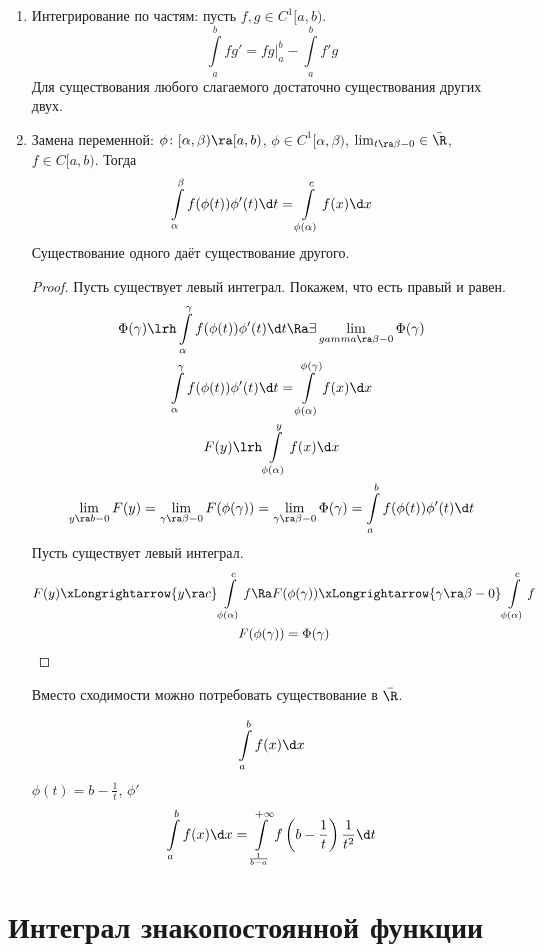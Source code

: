 \begin{enumerate}
\item
	Интегрирование по частям: пусть $f, g \in C^1[a,b)$.
	\[ \int\limits_a^b fg' = fg \biggr|_a^b - \int\limits_a^b f'g \]
	Для существования любого слагаемого достаточно существования других двух.

\item
	Замена переменной: $\phi\colon [\alpha, \beta) \ra [a, b)$, $\phi \in C^1[\alpha, \beta)$, $\lim_{t\ra\beta-0} \in \bar \R$,
	$f \in C[a, b)$.
	Тогда
	\[ \int\limits_\alpha^\beta f(\phi(t)) \phi'(t) \d t = \int\limits_{\phi(\alpha)}^c f(x) \d x \]
	Существование одного даёт существование другого.
	\begin{proof}
		Пусть существует левый интеграл.
		Покажем, что есть правый и равен.
		\begin{gather*}
			\Phi(\gamma) \lrh \int\limits_\alpha^\gamma f(\phi(t)) \phi'(t) \d t \Ra \exists \lim_{gamma\ra\beta-0} \Phi(\gamma) \\
			\int\limits_\alpha^\gamma f(\phi(t)) \phi'(t) \d t = \int\limits_{\phi(\alpha)}^{\phi(\gamma)} f(x) \d x \\
			F(y) \lrh \int\limits_{\phi(\alpha)}^y f(x) \d x \\
			\lim_{y\ra b-0} F(y) = \lim_{\gamma\ra\beta-0} F(\phi(\gamma))
			= \lim_{\gamma\ra\beta-0} \Phi(\gamma) = \int\limits_a^b f(\phi(t)) \phi'(t) \d t
		\end{gather*}
		Пусть существует левый интеграл.
		\begin{gather*}
			F(y) \xLongrightarrow{y\ra c} \int\limits_{\phi(\alpha)}^c f
			\Ra F(\phi(\gamma)) \xLongrightarrow{\gamma\ra\beta-0} \int\limits_{\phi(\alpha)}^c f \\
			F(\phi(\gamma)) = \Phi(\gamma)
		\end{gather*}
	\end{proof}
	
	\begin{Rem}
		Вместо сходимости можно потребовать существование в $\bar \R$.
	\end{Rem}

	\begin{Rem}
		\[ \int\limits_a^b f(x) \d x \]
		$\phi(t) = b - \frac1t$, $\phi'$
		\[ \int\limits_a^b f(x) \d x = \int\limits_{\frac1{b-a}}^{+\infty} f\left(b - \frac1t\right)\frac1{t^2} \d t \]
	\end{Rem}
\end{enumerate}

\section{Интеграл знакопостоянной функции}

